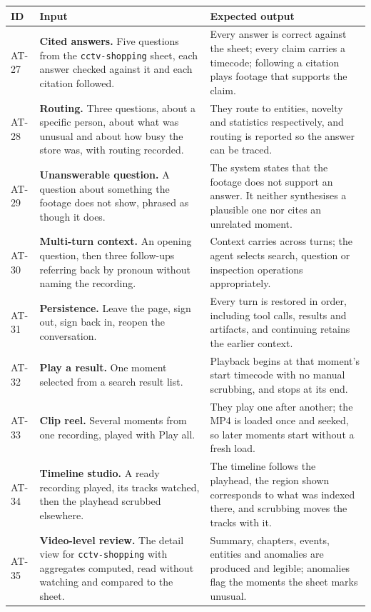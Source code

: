 \documentclass[11pt,a4paper]{article}
\begin{document}
\begin{table}[htbp]
\centering
\scriptsize
\begin{tabularx}{\textwidth}{@{}L{0.85cm}XX@{}}
\toprule
\textbf{ID} & \textbf{Input} & \textbf{Expected output} \\
\midrule
AT-27 & \textbf{Cited answers.} Five questions from the \texttt{cctv-shopping} sheet, each answer checked against it and each citation followed. & Every answer is correct against the sheet; every claim carries a timecode; following a citation plays footage that supports the claim. \\
AT-28 & \textbf{Routing.} Three questions, about a specific person, about what was unusual and about how busy the store was, with routing recorded. & They route to entities, novelty and statistics respectively, and routing is reported so the answer can be traced. \\
AT-29 & \textbf{Unanswerable question.} A question about something the footage does not show, phrased as though it does. & The system states that the footage does not support an answer. It neither synthesises a plausible one nor cites an unrelated moment. \\
AT-30 & \textbf{Multi-turn context.} An opening question, then three follow-ups referring back by pronoun without naming the recording. & Context carries across turns; the agent selects search, question or inspection operations appropriately. \\
AT-31 & \textbf{Persistence.} Leave the page, sign out, sign back in, reopen the conversation. & Every turn is restored in order, including tool calls, results and artifacts, and continuing retains the earlier context. \\
AT-32 & \textbf{Play a result.} One moment selected from a search result list. & Playback begins at that moment's start timecode with no manual scrubbing, and stops at its end. \\
AT-33 & \textbf{Clip reel.} Several moments from one recording, played with Play all. & They play one after another; the MP4 is loaded once and seeked, so later moments start without a fresh load. \\
AT-34 & \textbf{Timeline studio.} A ready recording played, its tracks watched, then the playhead scrubbed elsewhere. & The timeline follows the playhead, the region shown corresponds to what was indexed there, and scrubbing moves the tracks with it. \\
AT-35 & \textbf{Video-level review.} The detail view for \texttt{cctv-shopping} with aggregates computed, read without watching and compared to the sheet. & Summary, chapters, events, entities and anomalies are produced and legible; anomalies flag the moments the sheet marks unusual. \\

\end{tabularx}
\end{table}
\end{document}
